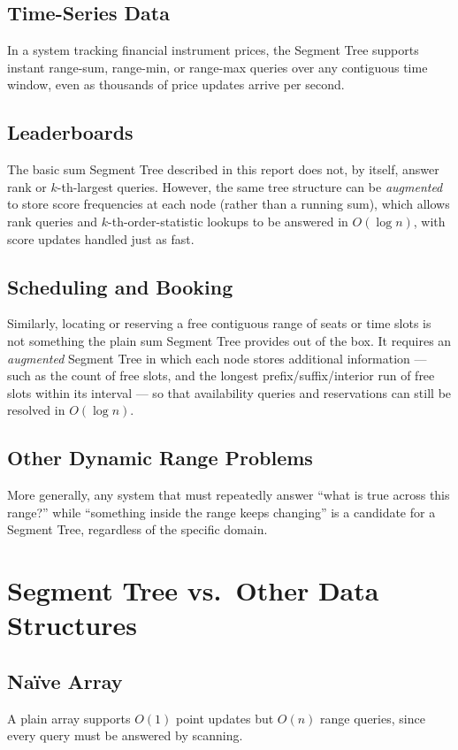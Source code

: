 \documentclass[11pt]{article}
\begin{document}
\subsection{Time-Series Data}
In a system tracking financial instrument prices, the Segment Tree supports instant range-sum, range-min, or range-max queries over any contiguous time window, even as thousands of price updates arrive per second.

\subsection{Leaderboards}
The basic sum Segment Tree described in this report does not, by itself, answer rank or $k$-th-largest queries. However, the same tree structure can be \emph{augmented} to store score frequencies at each node (rather than a running sum), which allows rank queries and $k$-th-order-statistic lookups to be answered in $O(\log n)$, with score updates handled just as fast.

\subsection{Scheduling and Booking}
Similarly, locating or reserving a free contiguous range of seats or time slots is not something the plain sum Segment Tree provides out of the box. It requires an \emph{augmented} Segment Tree in which each node stores additional information --- such as the count of free slots, and the longest prefix/suffix/interior run of free slots within its interval --- so that availability queries and reservations can still be resolved in $O(\log n)$.

\subsection{Other Dynamic Range Problems}
More generally, any system that must repeatedly answer ``what is true across this range?'' while ``something inside the range keeps changing'' is a candidate for a Segment Tree, regardless of the specific domain.

\section{Segment Tree vs.\ Other Data Structures}

\subsection{Na\"ive Array}
A plain array supports $O(1)$ point updates but $O(n)$ range queries, since every query must be answered by scanning.
\end{document}
